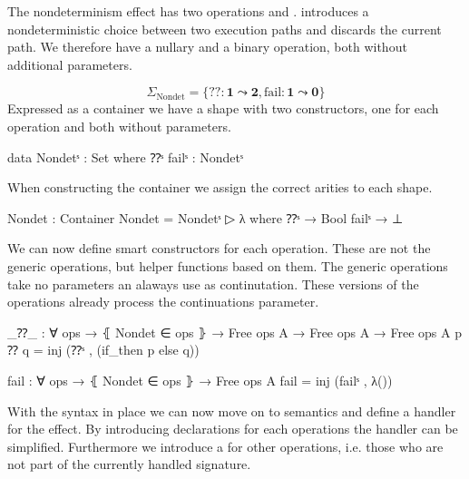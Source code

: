 The nondeterminism effect has two operations  and
.
 introduces a nondeterministic choice between two execution
paths and  discards the current path.
We therefore have a nullary and a binary operation, both without additional
parameters.

$$
\Sigma_{\text{Nondet}} = \{ ?\!? : \mathbf{1} \leadsto \mathbf{2}, \mathrm{fail}
: \mathbf{1} \leadsto \mathbf{0} \}
$$
Expressed as a container we have a shape with two constructors, one for each
operation and both without parameters.

\begin{code}
data Nondetˢ : Set where ⁇ˢ failˢ : Nondetˢ
\end{code}
When constructing the container we assign the correct arities to each shape.

\begin{code}
Nondet : Container
Nondet = Nondetˢ ▷ λ where
  ⁇ˢ     → Bool
  failˢ  → ⊥
\end{code}
We can now define smart constructors for each operation.
These are not the generic operations, but helper functions based on them.
The generic operations take no parameters an alaways use %
 as continutation.
These versions of the operations already process the continuations parameter.

\begin{code}
_⁇_ : ∀ {ops} → ⦃ Nondet ∈ ops ⦄ → Free ops A → Free ops A → Free ops A
p ⁇ q = inj (⁇ˢ , (if_then p else q))

fail : ∀ {ops} → ⦃ Nondet ∈ ops ⦄ → Free ops A
fail = inj (failˢ , λ())
\end{code}
With the syntax in place we can now move on to semantics and define a handler
for the effect.
By introducing  declarations for each operations the
handler can be simplified.
Furthermore we introduce a  for other operations, i.e.
those who are not part of the currently handled signature.

